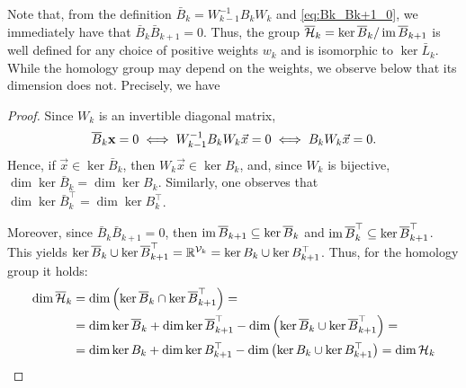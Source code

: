 Note that, from the definition \( \bar B_k= W_{k-1}^{-1} B_k W_k \) and \eqref{eq:Bk_Bk+1_0}, we immediately have that  \( \bar B_k\bar B_{k+1}=0 \). Thus, the group \( \overline{\mathcal{H}}_k = \ker \overline{B}_k / \operatorname{im} \overline{B}_{k+1} \) is well defined for any choice of positive weights  \( w_k \) and is isomorphic to \( \ker \bar L_k \). While the homology group may depend on the weights,  we observe below that its dimension does not. Precisely, we have 

\begin{proof}
Since \( W_k \) is an invertible diagonal matrix, 
\begin{equation*}
    \overline{B}_k \mathbf{x} = 0 \iff W_{k-1}^{-1}B_k W_k \vec x =0 \iff B_k W_k \vec x =0. 
\end{equation*}
Hence, if \( \vec x \in \ker \bar B_k \), then \( W_k \vec x \in \ker B_k \), and, since \( W_k \) is bijective, \( \dim \ker \bar B_k = \dim \ker B_k \). Similarly, one observes that \( \dim \ker \bar B_k^\top = \dim \ker B_k^\top \).

Moreover, since \( \bar B_k \bar B_{k+1} =0 \), then \( \operatorname{im} \overline{B}_{k+1} \subseteq \ker \overline{B}_k \) and \( \operatorname{im} \overline{B}_k^\top \subseteq \ker \overline{B}_{k+1}^\top \). This yields \( \ker \overline{B}_k \cup \ker \overline{B}_{k+1}^\top = \mathbb{R}^{\mathcal{V}_k} = \ker B_k \cup \ker  B_{k+1}^\top\). Thus, for the homology group it holds:
\begin{equation*}
      \begin{aligned}
    \dim \overline{\mathcal{H}}_k & = \dim \left( \ker \overline{B}_k \cap \ker \overline{B}_{k+1}^\top \right)= \\
    & = \dim \ker \overline{B}_k + \dim \ker \overline{B}_{k+1}^\top - \dim \left( \ker \overline{B}_k \cup \ker \overline{B}_{k+1}^\top \right) = \\
    & = \dim \ker B_k + \dim \ker  B_{k+1}^\top - \dim \left( \ker  B_k \cup \ker  B_{k+1}^\top \right) = \dim \mathcal{H}_k
      \end{aligned}
\end{equation*}
\end{proof}




